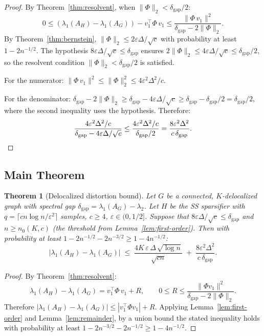 \documentclass[11pt]{article}
\newtheorem{theorem}{Theorem}[section]
\theoremstyle{definition}
\newcommand{\eps}{\varepsilon}
\newcommand{\lamH}{\lambda_1(A_H)}
\newcommand{\lamG}{\lambda_1(A_G)}
\newcommand{\vone}{v_1}
\begin{document}
\begin{proof}
By Theorem~\ref{thm:resolvent}, when $\|\Phi\|_2 < \delta_{\mathrm{gap}}/2$:
\[
0 \leq (\lamH - \lamG) - \vone^\top \Phi\,\vone
\leq \frac{\|\Phi\,\vone\|^2}{\delta_{\mathrm{gap}} - 2\|\Phi\|_2}.
\]
By Theorem~\ref{thm:bernstein}, $\|\Phi\|_2 \leq 2\eps\Delta/\sqrt{c}$
with probability at least $1 - 2n^{-1/2}$. The hypothesis
$8\eps\Delta/\sqrt{c} \leq \delta_{\mathrm{gap}}$ ensures
$2\|\Phi\|_2 \leq 4\eps\Delta/\sqrt{c} \leq \delta_{\mathrm{gap}}/2$,
so the resolvent condition $\|\Phi\|_2 < \delta_{\mathrm{gap}}/2$ is satisfied.

For the numerator: $\|\Phi\,\vone\|^2 \leq \|\Phi\|_2^2 \leq 4\eps^2\Delta^2/c$.

For the denominator:
$\delta_{\mathrm{gap}} - 2\|\Phi\|_2
\geq \delta_{\mathrm{gap}} - 4\eps\Delta/\sqrt{c}
\geq \delta_{\mathrm{gap}} - \delta_{\mathrm{gap}}/2
= \delta_{\mathrm{gap}}/2$,
where the second inequality uses the hypothesis. Therefore:
\[
\frac{4\eps^2\Delta^2/c}{\delta_{\mathrm{gap}} - 4\eps\Delta/\sqrt{c}}
\leq \frac{4\eps^2\Delta^2/c}{\delta_{\mathrm{gap}}/2}
= \frac{8\eps^2\Delta^2}{c\,\delta_{\mathrm{gap}}}. \qedhere
\]
\end{proof}

\subsection{Main Theorem}

\begin{theorem}[Delocalized distortion bound]\label{thm:delocalized}
Let $G$ be a connected, $K$-delocalized graph with spectral gap
$\delta_{\mathrm{gap}} = \lamG - \lambda_2$. Let $H$ be the SS sparsifier with
$q = \lceil cn\log n/\eps^2 \rceil$ samples, $c \geq 4$, $\eps \in (0, 1/2]$.
Suppose that $8\eps\Delta/\sqrt{c} \leq \delta_{\mathrm{gap}}$ and $n \geq n_0(K,c)$
(the threshold from Lemma~\ref{lem:first-order}). Then with probability at
least $1 - 2n^{-1/2} - 2n^{-3/2} \geq 1 - 4n^{-1/2}$:
\[
|\lamH - \lamG| \;\leq\;
\frac{4K\,\eps\,\Delta\,\sqrt{\log n}}{\sqrt{cn}}
\;+\; \frac{8\eps^2\Delta^2}{c\,\delta_{\mathrm{gap}}}.
\]
\end{theorem}

\begin{proof}
By Theorem~\ref{thm:resolvent}:
\[
\lamH - \lamG = \vone^\top \Phi\,\vone + R,
\qquad 0 \leq R \leq \frac{\|\Phi\vone\|^2}{\delta_{\mathrm{gap}} - 2\|\Phi\|_2}.
\]
Therefore
$|\lamH - \lamG| \leq |\vone^\top \Phi\vone| + R$.
Applying Lemma~\ref{lem:first-order} and Lemma~\ref{lem:remainder},
by a union bound the stated inequality holds with probability
at least $1 - 2n^{-3/2} - 2n^{-1/2} \geq 1 - 4n^{-1/2}$.
\end{proof}
\end{document}
